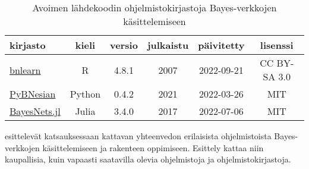\begin{table}[ht] 
\centering 
\caption{Avoimen lähdekoodin ohjelmistokirjastoja Bayes-verkkojen käsittelemiseen\label{table:softat}} 

\begin{tabular}{l|| c c c c c}  
    kirjasto & kieli & versio & julkaistu & päivitetty & lisenssi \\ 
    \hline \hline  
    
    \href{https://github.com/cran/bnlearn}{bnlearn} & R & 4.8.1 & 2007 & 2022-09-21 & CC BY-SA 3.0 \\ 

    \href{https://github.com/davenza/PyBNesian}{PyBNesian} & Python & 0.4.2 & 2021 & 2022-03-26 & MIT \\ 

    \href{https://github.com/sisl/BayesNets.jl}{BayesNets.jl} & Julia & 3.4.0 & 2017 & 2022-07-06 & MIT  \\ 

    \hline 
\end{tabular} 
\end{table} 

\citet{scanagatta_survey_2019} esittelevät katsauksessaan kattavan yhteenvedon erilaisista ohjelmistoista Bayes-verkkojen käsittelemiseen ja rakenteen oppimiseen. Esittely kattaa niin kaupallisia, kuin vapaasti saatavilla olevia ohjelmistoja ja ohjelmistokirjastoja.  